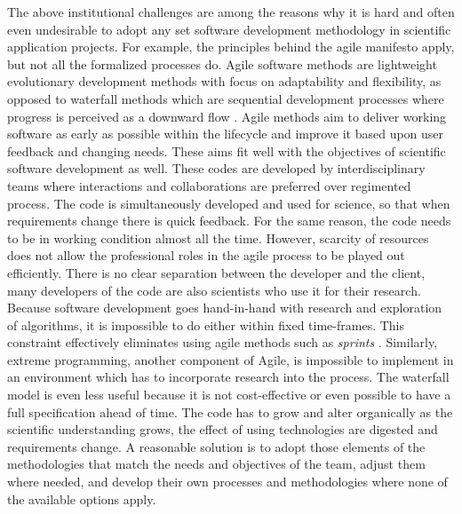 The above institutional challenges are among the reasons why it is
hard and often even undesirable to adopt any set software development
methodology in scientific application projects. For example, the principles
behind the agile manifesto apply, but not all the formalized processes
do. Agile software methods \cite{agile} are lightweight evolutionary development
methods with focus on adaptability and flexibility, as opposed to
waterfall methods which are sequential development processes where
progress is perceived as a downward flow \cite{waterfall}. 
Agile methods aim to deliver working software as early as possible
within the lifecycle and improve it based upon user feedback and
changing needs. These aims fit well with the objectives of scientific
software development as well. 
These codes are developed by interdisciplinary teams where
interactions and collaborations are preferred over regimented
process. The code is simultaneously developed and used for science, so
that when requirements change there is quick feedback.  For the 
same reason, the code needs to be in working condition almost all the
time. However, scarcity of resources does not allow the professional roles in
the agile process to be played out efficiently.  There is no clear
separation between the developer and the client, many developers of
the code are also scientists who use it for their research. 
Because software development goes hand-in-hand with research and
exploration of algorithms, it is impossible to do either within
fixed time-frames. This constraint effectively eliminates using agile
methods such as {\em sprints} \cite{agile}. Similarly, extreme
programming, another component of Agile, is impossible to implement in
an environment which has to incorporate research into the process. The
waterfall model is even less useful because it is not cost-effective
or even possible to have a full specification ahead of time. The code
has to grow and alter organically as the scientific understanding
grows, the effect of using technologies are digested and requirements
change. A reasonable solution is to adopt those elements of the
methodologies that match the needs and objectives of the team,
adjust them where needed, and develop their own processes and
methodologies where none of the available options apply.

